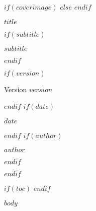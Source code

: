 \documentclass[11pt,a4paper]{article}
\begin{document}
\begin{titlepage}
\vspace*{\CDPMTitleTop}
$if(coverimage)$
  \noindent\hspace*{-\dimexpr\oddsidemargin+\hoffset+1in\relax}%
  \vspace{\CDPMAfterCoverSpace}
$else$
  \vspace*{\CDPMCoverHeight}
  \vspace{\CDPMAfterCoverSpace}
$endif$
{\sffamily\Huge\bfseries\color{cdpmblue} $title$\par}
$if(subtitle)$
\vspace{\CDPMTitleSubtitleSep}
{\sffamily\Large\color{cdpmblue} $subtitle$\par}
$endif$
\vspace{0.2cm}
\vfill
{
  \begin{center}
  $if(version)$
  {\sffamily\normalsize\color{cdpmgray} Version $version$\par}
  $endif$
  $if(date)$
  {\sffamily\normalsize\color{cdpmgray} $date$\par}
  $endif$
  $if(author)$
  {\sffamily\large $author$\par}
  $endif$
  \end{center}
}
\end{titlepage}
$endif$

$if(toc)$
\tableofcontents
\newpage
$endif$

$body$
\end{document}
